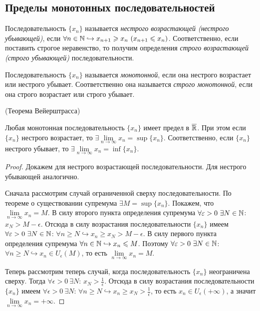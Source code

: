 \subsection{Пределы монотонных последовательностей}

\begin{definition}
    Последовательность $\{ x_{n} \}$ называется \textit{нестрого возрастающей (нестрого убывающей)}, если $\forall n \in \mathbb{N} \hookrightarrow x_{n + 1} \geqslant x_{n} \  (x_{n + 1} \leqslant x_{n})$. Соответственно, если поставить строгое неравенство, то получим определения \textit{строго возрастающей (строго убывающей)} последовательности.
\end{definition}
\begin{definition}
    Последовательность $\{ x_{n} \}$ называется \textit{монотонной}, если она нестрого возрастает или нестрого убывает. Соответственно она называется \textit{строго монотонной}, если она строго возрастает или строго убывает.
\end{definition}
\begin{theorem}
    \hypertarget{thm2.6}{(Теорема Вейерштрасса)} Любая монотонная последовательность $\{ x_{n} \}$ имеет предел в $\overline{\mathbb{R}}$. При этом если $\{ x_{n} \}$ нестрого возрастает, то $\exists \lim\limits_{n\to \infty} x_{n} = \sup \{ x_{n} \}$. Соответственно, если $\{ x_{n} \}$ нестрого убывает, то $\exists \lim\limits_{n\to \infty} x_{n} = \inf \{ x_{n} \}$.
\end{theorem}
\begin{proof}
    Докажем для нестрого возрастающей последовательности. Для нестрого убывающей аналогично.

    Сначала рассмотрим случай ограниченной сверху последовательности. По теореме о существовании супремума $\exists M = \sup \{ x_{n} \}$. Покажем, что $\lim\limits_{n\to \infty} x_{n} = M$. В силу второго пункта определения супремума $\forall \varepsilon > 0 \  \exists N \in \mathbb{N}$: $x_{N} > M - \epsilon$. Отсюда в силу возрастания последовательности $\{ x_{n} \}$ имеем $\forall \varepsilon > 0 \  \exists N \in \mathbb{N}$: $\forall n \geq N \hookrightarrow x_{n} \geq x_{N} > M - \epsilon$. В силу первого пункта определения супремума $\forall n \in \mathbb{N} \hookrightarrow x_{n} \leqslant M$. Поэтому $\forall \varepsilon > 0  \  \exists N \in \mathbb{N}$: $\forall n \geq N \hookrightarrow x_{n} \in U_{\epsilon} (M)$, то есть $\lim\limits_{n\to \infty } x_{n} = M$.

    Теперь рассмотрим теперь случай, когда последовательность $\{ x_{n} \}$ неограничена сверху. Тогда $\forall \epsilon > 0 \  \exists N$: $x_{N} > \frac{1}{\epsilon}$. Отсюда в силу возрастания последовательности $\{ x_{n} \}$ имеем $\forall \epsilon > 0 \  \exists N$: $\forall n \geq N \hookrightarrow x_{n} \geq x_{N} > \frac{1}{\epsilon}$, то есть $x_{n} \in U_{\epsilon} (+ \infty)$, а значит $\lim\limits_{n\to \infty} x_{n} = +\infty.$
\end{proof}


